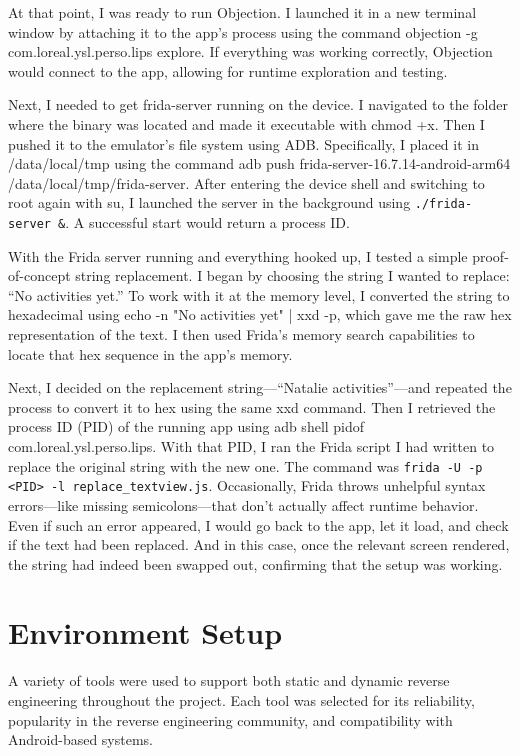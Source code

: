 At that point, I was ready to run Objection. I launched it in a new terminal window by attaching it to the app’s process using the command objection -g com.loreal.ysl.perso.lips explore. If everything was working correctly, Objection would connect to the app, allowing for runtime exploration and testing.

Next, I needed to get frida-server running on the device. I navigated to the folder where the binary was located and made it executable with chmod +x. Then I pushed it to the emulator’s file system using ADB. Specifically, I placed it in /data/local/tmp using the command adb push frida-server-16.7.14-android-arm64 /data/local/tmp/frida-server. After entering the device shell and switching to root again with su, I launched the server in the background using \texttt{./frida-server \&}. A successful start would return a process ID.

With the Frida server running and everything hooked up, I tested a simple proof-of-concept string replacement. I began by choosing the string I wanted to replace: “No activities yet.” To work with it at the memory level, I converted the string to hexadecimal using echo -n "No activities yet" | xxd -p, which gave me the raw hex representation of the text. I then used Frida’s memory search capabilities to locate that hex sequence in the app’s memory.

Next, I decided on the replacement string—“Natalie activities”—and repeated the process to convert it to hex using the same xxd command. Then I retrieved the process ID (PID) of the running app using adb shell pidof com.loreal.ysl.perso.lips. With that PID, I ran the Frida script I had written to replace the original string with the new one. The command was \texttt{frida -U -p <PID> -l replace\_textview.js}. Occasionally, Frida throws unhelpful syntax errors—like missing semicolons—that don’t actually affect runtime behavior. Even if such an error appeared, I would go back to the app, let it load, and check if the text had been replaced. And in this case, once the relevant screen rendered, the string had indeed been swapped out, confirming that the setup was working.



\section{Environment Setup}
A variety of tools were used to support both static and dynamic reverse engineering 
throughout the project. Each tool was selected for its reliability, popularity in the reverse engineering community, and compatibility with Android-based systems.


